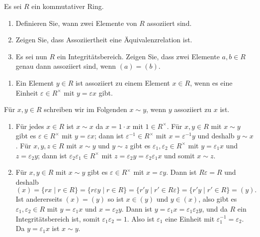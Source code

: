\begin{question}
  Es sei $R$ ein kommutativer Ring.
  \begin{enumerate}
    \item
      Definieren Sie, wann zwei Elemente von $R$ assoziiert sind.
    \item
      Zeigen Sie, dass Assoziiertheit eine Äquivalenzrelation ist.
    \item
      Es sei nun $R$ ein Integritätsbereich.
      Zeigen Sie, dass zwei Elemente $a, b \in R$ genau dann assoziiert sind, wenn $(a) = (b)$.
  \end{enumerate}
\end{question}


\begin{solution}
  \begin{enumerate}
    \item
      Ein Element $y \in R$ ist assoziiert zu einem Element $x \in R$, wenn es eine Einheit $\varepsilon \in R^\times$ mit $y = \varepsilon x$ gibt.
  \end{enumerate}
  Für $x, y \in R$ schreiben wir im Folgenden $x \sim y$, wenn $y$ assoziiert zu $x$ ist.
  \begin{enumerate}[resume]
    \item
      Für jedes $x \in R$ ist $x \sim x$ da $x = 1 \cdot x$ mit $1 \in R^\times$.
      Für $x, y \in R$ mit $x \sim y$ gibt es $\varepsilon \in R^\times$ mit $y = \varepsilon x$;
      dann ist $\varepsilon^{-1} \in R^\times$ mit $x = \varepsilon^{-1} y$ und deshalb $y \sim x$.
      Für $x, y, z \in R$ mit $x \sim y$ und $y \sim z$ gibt es $\varepsilon_1, \varepsilon_2 \in R^\times$ mit $y = \varepsilon_1 x$ und $z = \varepsilon_2 y$;
      dann ist $\varepsilon_2 \varepsilon_1 \in R^\times$ mit $z = \varepsilon_2 y = \varepsilon_2 \varepsilon_1 x$ und somit $x \sim z$.
    \item
      Für $x, y \in R$ mit $x \sim y$ gibt es $\varepsilon \in R^\times$ mit $x = \varepsilon y$.
      Dann ist $R \varepsilon = R$ und deshalb
      \[
          (x)
        = \{r x \mid r \in R\}
        = \{r \varepsilon y \mid r \in R\}
        = \{r' y \mid r' \in R \varepsilon\}
        = \{r' y \mid r' \in R\}
        = (y).
      \]
      Ist andererseits $(x) = (y)$ so ist $x \in (y)$ und $y \in (x)$, also gibt es $\varepsilon_1, \varepsilon_2 \in R$ mit $y = \varepsilon_1 x$ und $x = \varepsilon_2 y$.
      Dann ist $y = \varepsilon_1 x = \varepsilon_1 \varepsilon_2 y$, und da $R$ ein Integritätsbereich ist, somit $\varepsilon_1 \varepsilon_2 = 1$.
      Also ist $\varepsilon_1$ eine Einheit mit $\varepsilon_1^{-1} = \varepsilon_2$.
      Da $y = \varepsilon_1 x$ ist $x \sim y$.
  \end{enumerate}
\end{solution}



